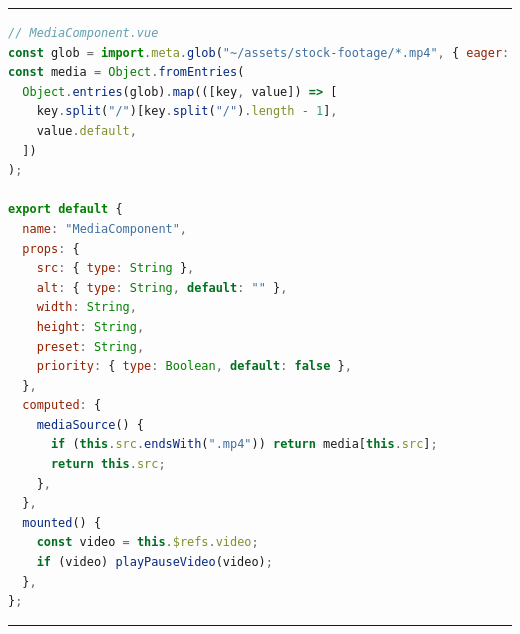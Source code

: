 \documentclass[a4paper, 12pt]{article}
\begin{document}


\vspace{0.5cm} \hrule \vspace{0.5cm}

\begin{lstlisting}[caption=MediaComponent in Nuxt (Script), label={lst:Nuxt:MediaComponent:Script}, language=JavaScript, firstnumber=13, escapechar=°]
// MediaComponent.vue
const glob = import.meta.glob("~/assets/stock-footage/*.mp4", { eager: true });°\label{line:Nuxt:MediaComponent:imageImport}°
const media = Object.fromEntries(
  Object.entries(glob).map(([key, value]) => [
    key.split("/")[key.split("/").length - 1],
    value.default,
  ])
);

export default {
  name: "MediaComponent",
  props: {
    src: { type: String },
    alt: { type: String, default: "" },
    width: String,
    height: String,
    preset: String,
    priority: { type: Boolean, default: false },
  },
  computed: {
    mediaSource() {
      if (this.src.endsWith(".mp4")) return media[this.src];
      return this.src;
    },
  },
  mounted() {
    const video = this.$refs.video;
    if (video) playPauseVideo(video);
  },
};
\end{lstlisting}

\vspace{0.5cm} \hrule \vspace{0.5cm}
\end{document}
